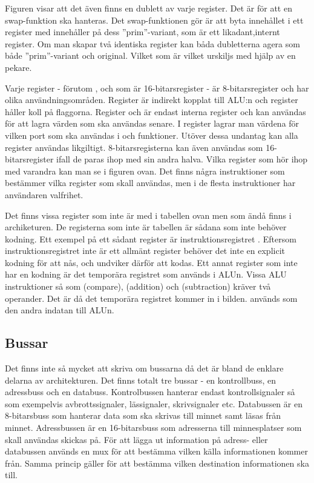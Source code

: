 \documentclass[main.tex]{subfiles}
\begin{document}
Figuren visar att det även finns en dublett av varje register. Det är för att
en swap-funktion ska hanteras. Det swap-funktionen gör är att byta innehållet i
ett register med innehåller på dess ''prim''-variant, som är ett
likadant,internt register. Om man skapar två identiska register kan båda
dubletterna agera som både ''prim''-variant och original. Vilket som är vilket
urskiljs med hjälp av en pekare.

Varje register - förutom ,  och  som är
16-bitarsregister - är 8-bitarsregister och har olika användningsområden.
Register  är indirekt kopplat till ALU:n och register  håller
koll på flaggorna. Register  och  är endast interna register
och kan användas för att lagra värden som ska användas senare. I register
 lagrar man värdena för vilken port som ska användas i  och
 funktioner. Utöver dessa undantag kan alla register användas
likgiltigt. 8-bitarsregisterna kan även användas som 16-bitarsregister ifall de
paras ihop med sin andra halva. Vilka register som hör ihop med varandra kan
man se i figuren ovan. Det finns några instruktioner som bestämmer vilka
register som skall användas, men i de flesta instruktioner har användaren
valfrihet.

Det finns vissa register som inte är med i tabellen ovan men som ändå finns i
archiketuren. De registerna som inte är tabellen är sådana som inte behöver
kodning. Ett exempel på ett sådant register är instruktionsregistret .
Eftersom instruktionsregistret inte är ett allmänt register behöver det inte en
explicit kodning för att nås, och undviker därför att kodas. Ett annat register
som inte har en kodning är det temporära registret som används i ALUn.  Vissa
ALU instruktioner så som  (compare),  (addition) och
 (subtraction) kräver två operander. Det är då det temporära
registret  kommer in i bilden.  används som den andra
indatan till ALUn.

\subsection{Bussar}
Det finns inte så mycket att skriva om bussarna då det är bland de enklare
delarna av architekturen. Det finns totalt tre bussar - en kontrollbuss, en
adressbuss och en databuss. Kontrolbussen hanterar endast kontrollsignaler så
som exempelvis avbrottssignaler, lässignaler, skrivsignaler etc. Databussen är
en 8-bitarsbuss som hanterar data som ska skrivas till minnet samt läsas från
minnet. Adressbussen är en 16-bitarsbuss som adresserna till minnesplatser som
skall användas skickas på. För att lägga ut information på adress- eller
databussen används en mux för att bestämma vilken källa informationen kommer
från. Samma princip gäller för att bestämma vilken destination informationen
ska till.
\end{document}
